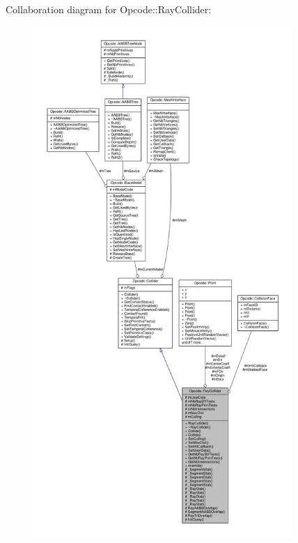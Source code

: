 Collaboration diagram for Opcode\+:\+:Ray\+Collider\+:
\nopagebreak
\begin{figure}[H]
\begin{center}
\leavevmode
\includegraphics[height=550pt]{d3/d76/classOpcode_1_1RayCollider__coll__graph}
\end{center}
\end{figure}
